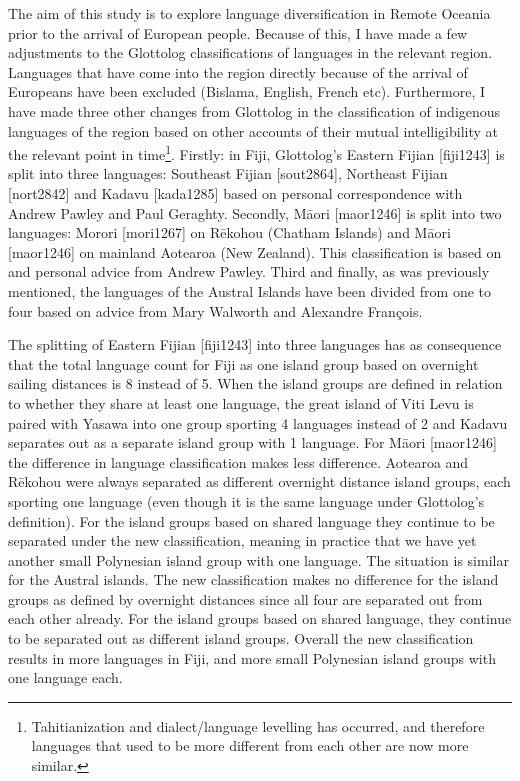 \documentclass[unnumsec,webpdf,modern,medium]{oup-authoring-template}
\begin{document}
\begin{appendices}
The aim of this study is to explore language diversification in Remote Oceania prior to the arrival of European people. Because of this, I have made a few adjustments to the Glottolog classifications of languages in the relevant region. Languages that have come into the region directly because of the arrival of Europeans have been excluded (Bislama, English, French etc). Furthermore, I have made three other changes from Glottolog in the classification of indigenous languages of the region based on other accounts of their mutual intelligibility at the relevant point in time\footnote{Tahitianization and dialect/language levelling has occurred, and therefore languages that used to be more different from each other are now more similar.}. Firstly: in Fiji, Glottolog's Eastern Fijian [fiji1243] is split into three languages: Southeast Fijian [sout2864], Northeast Fijian [nort2842] and Kadavu [kada1285] based on personal correspondence with Andrew Pawley and Paul Geraghty. Secondly, M\={a}ori [maor1246] is split into two languages: Morori [mori1267] on R\={e}kohou (Chatham Islands) and M\={a}ori [maor1246] on mainland Aotearoa (New Zealand). This classification is based on \citet{harlow1973regional} and personal advice from Andrew Pawley. Third and finally, as was previously mentioned, the languages of the Austral Islands have been divided from one to four based on advice from Mary Walworth and Alexandre François.

The splitting of Eastern Fijian [fiji1243] into three languages has as consequence that the total language count for Fiji as one island group based on overnight sailing distances is 8 instead of 5. When the island groups are defined in relation to whether they share at least one language, the great island of Viti Levu is paired with Yasawa into one group sporting 4 languages instead of 2 and Kadavu separates out as a separate island group with 1 language. For M\={a}ori [maor1246] the difference in language classification makes less difference. Aotearoa and  R\={e}kohou were always separated as different overnight distance island groups, each sporting one language (even though it is the same language under Glottolog's definition). For the island groups based on shared language they continue to be separated under the new classification, meaning in practice that we have yet another small Polynesian island group with one language. The situation is similar for the Austral islands. The new classification makes no difference for the island groups as defined by overnight distances since all four are separated out from each other already. For the island groups based on shared language, they continue to be separated out as different island groups. Overall the new classification results in more languages in Fiji, and more small Polynesian island groups with one language each.



\end{appendices}
\end{document}
